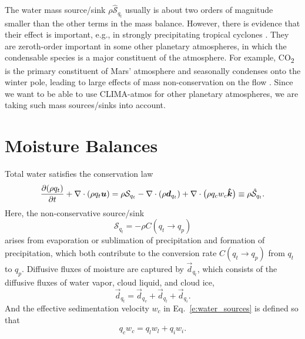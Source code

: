 \documentclass{report}
\begin{document}
The water mass source/sink $\rho \mathcal{\hat S}_{q_t}$ usually is about two orders of magnitude smaller than the other terms in the mass balance. However, there is evidence that their effect is important, e.g., in strongly precipitating tropical cyclones \citep{Qiu93a,Lackmann04a}. They are zeroth-order important in some other planetary atmospheres, in which the condensable species is a major constituent of the atmosphere. For example, CO\textsubscript{2} is the primary constituent of Mars' atmosphere and seasonally condenses onto the winter pole, leading to large effects of mass non-conservation on the flow \cite[e.g.,][]{Soto15a}. Since we want to be able to use CLIMA-atmos for other planetary atmospheres, we are taking such mass sources/sinks into account.

\section{Moisture Balances}\label{s:moisture_balance}

Total water satisfies the conservation law
\begin{equation}
\frac{\partial (\rho q_t)}{\partial t} + \nabla \cdot (\rho q_t \boldsymbol{{u}})
= \rho \mathcal{S}_{q_t} - \nabla \cdot (\rho \boldsymbol{{d}}_{q_t}) + \nabla \cdot \bigl(\rho q_c w_c \boldsymbol{{\hat k}}  \bigr)
\equiv \rho \mathcal{\hat S}_{q_t}.   
\label{eq:governing_equations/moisture}
\end{equation}
Here, the non-conservative source/sink
\begin{equation}\label{e:water_sources}
     \mathcal{S}_{q_t} = - \rho C(q_t \rightarrow q_p)
\end{equation}
arises from evaporation or sublimation of precipitation and formation of precipitation, which both contribute to the conversion rate $C(q_t \rightarrow q_p)$ from $q_t$ to $q_p$. Diffusive fluxes of moisture are captured by $\vec{d}_{q_t}$, which consists of the diffusive fluxes of water vapor, cloud liquid, and cloud ice, 
\begin{equation}
    \vec{d}_{q_t} =\vec{d}_{q_v} + \vec{d}_{q_l} + \vec{d}_{q_i}.
\end{equation}
And the effective sedimentation velocity $w_c$ in Eq.~\eqref{e:water_sources} is defined so that 
\begin{equation}
    q_c w_c = q_l w_l + q_i w_i.
\end{equation}
\end{document}
